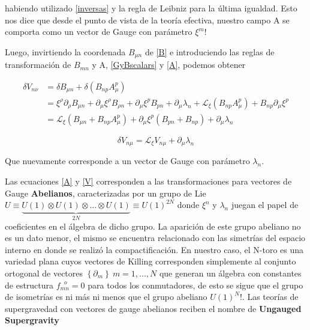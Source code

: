 \documentclass{article}
\numberwithin{equation}{section}
\begin{document}
habiendo utilizado \ref{inversas} y la regla de Leibniz para la última igualdad. Esto nos dice que desde el punto de vista de la teoría efectiva, nuestro campo A se comporta como un vector de Gauge con parámetro $ \xi^m $! 

Luego, invirtiendo la coordenada $ B_{\mu n} $ de \ref{B} e introduciendo las reglas de transformación de $ B_{m n} $ y A, \ref{GyBscalars} y \ref{A}, podemos obtener 


\begin{equation*}
\begin{aligned}
\delta V_{n \nu} &= \delta B_	{\mu n}  + \delta \left( B_{n p} A^p_{\mu} \right)\\
&= \xi^{\rho} \partial_{\rho} B_{\mu n} + \partial_{\mu} \xi^{\rho} B_{\rho n} + \partial_{\mu} \xi^{p} B_{p n} + \partial_{\mu} \lambda_n + \mathcal{L}_{\xi} \left( B_{n p} A^p_{\mu} \right) + B_{n p} \partial_{\mu} \xi^p\\
&=\mathcal{L}_{\xi} \left( B_	{\mu n} +  B_{n p} A^p_{\mu} \right) + \partial_{\mu} \xi^p \left( B_{p n} + B_{n p}\right) + \partial_{\mu} \lambda_n
\end{aligned}
\end{equation*}

\begin{boxquation}
	\begin{equation}\label{V}
	\delta V_{n \mu}= \mathcal{L}_{\xi} V_{n \mu} + \partial_{\mu} \lambda_n
	\end{equation}
\end{boxquation}

Que nuevamente corresponde a un vector de Gauge con parámetro $ \lambda_n $.

Las ecuaciones \ref{A} y \ref{V} corresponden a las transformaciones para vectores de Gauge \textbf{Abelianos}, caracterizadas por un grupo de Lie $ U \equiv \underbrace{U(1) \otimes U(1) \otimes \dots \otimes U(1)}_{2N} \equiv U(1)^{2N} $ donde $ \xi^n $ y $ \lambda_n $ juegan el papel de coeficientes en el álgebra de dicho grupo. La aparición de este grupo abeliano no es un dato menor, el mismo se encuentra relacionado con las simetrías del espacio interno en donde se realizó la compactificación. En nuestro caso, el N-toro es una variedad plana cuyos vectores de Killing corresponden simplemente al conjunto ortogonal de vectores $ \left\{ \partial_m  \right\} \ m=1,...,N$ que generan un álgebra con constantes de estructura $ f_{m n}^{\ \ \ o} = 0 $ para todos los conmutadores, de esto se sigue que el grupo de isometrías es ni más ni menos que el grupo abeliano $ U(1)^N $!. Las teorías de supergravedad con vectores de gauge abelianos reciben el nombre de \textbf{Ungauged Supergravity}\\
\end{document}
